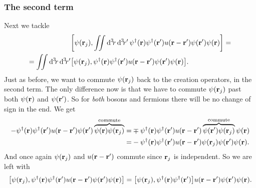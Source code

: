 \documentclass[11pt,letter, swedish, english
]{article}
\begin{document}
\subsubsection{The second term}
Next we tackle
\begin{equation}
\begin{aligned}
&\comm{\psi(\vb{r}_j)}{\iint\rd^3\!r\,\rd^3\!r'\,
\psi^\dagger(\vb{r})\psi^\dagger(\vb{r}')
u(\vb{r}-\vb{r}')\psi(\vb{r}')\psi(\vb{r})}=\\
=\iint\rd^3\!r\,\rd^3\!r'&
\comm{\psi(\vb{r}_j)}{
\psi^\dagger(\vb{r})\psi^\dagger(\vb{r}')
u(\vb{r}-\vb{r}')\psi(\vb{r}')\psi(\vb{r})}.
\end{aligned}
\end{equation}
Just as before, we want to commute $\psi(\vb{r}_j)$ back to the
creation operators, in the second term. The only difference now is
that we have to commute $\psi(\vb{r}_j)$ past both $\psi(\vb{r})$ and
$\psi(\vb{r}')$. So for \emph{both} bosons and fermions there will be no
change of sign in the end. We get
\begin{equation}
\begin{aligned}
-\psi^\dagger(\vb{r})\psi^\dagger(\vb{r}')
u(\vb{r}-\vb{r}')\psi(\vb{r}')
\overbrace{\psi(\vb{r})\psi(\vb{r}_j)}^{\text{commute}}
=&\mp\psi^\dagger(\vb{r})\psi^\dagger(\vb{r}')
u(\vb{r}-\vb{r}')
\overbrace{\psi(\vb{r}')\psi(\vb{r}_j)}^{\text{commute}}
\psi(\vb{r})\\
=&-\psi^\dagger(\vb{r})\psi^\dagger(\vb{r}')
u(\vb{r}-\vb{r}')\psi(\vb{r}_j)\psi(\vb{r}')\psi(\vb{r}).
\end{aligned}
\end{equation}
And once again $\psi(\vb{r}_j)$ and $u(\vb{r}-\vb{r}')$ commute since
$\vb{r}_j$ is independent. So we are left with
\begin{equation}
\comm{\psi(\vb{r}_j)}{
\psi^\dagger(\vb{r})\psi^\dagger(\vb{r}')
u(\vb{r}-\vb{r}')\psi(\vb{r}')\psi(\vb{r})}
=\comm{\psi(\vb{r}_j)}
{\psi^\dagger(\vb{r})\psi^\dagger(\vb{r}')}
u(\vb{r}-\vb{r}')\psi(\vb{r}')\psi(\vb{r}).
\end{equation}
\end{document}
